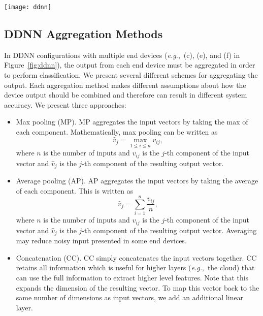 \documentclass[10pt, conference, compsocconf]{IEEEtran}
\newcommand{\eg}{\emph{e.g.}}
\begin{document}
\begin{figure*}
    \centering
    \texttt{[image: ddnn]}
    \caption{Overview of the DDNN architecture. The vertical lines represent the DNN pipeline, which connects the horizontal bars (NN layers). (a) is the standard DNN (processed entirely in the cloud), (b) introduces end devices and a local exit point that may classify samples before the cloud, (c) extends (b) by adding multiple end devices which are aggregated together for classification, (d) and (e) extend (b) and (c) by adding edge layers between the cloud and end devices, and (f) shows how the edge can also be distributed like the end devices.}
    \label{fig:ddnn}
\end{figure*}

\subsection{DDNN Aggregation Methods}
\label{sec:agg}
In DDNN configurations with multiple end devices (\eg,~(c), (e), and (f) in Figure~\ref{fig:ddnn}), the output from each end device must be aggregated in order to perform classification. We present several different schemes for aggregating the output. Each aggregation method makes different assumptions about how the device output should be combined and therefore can result in different system accuracy. We present three approaches:
\begin{itemize}
    \item Max pooling (MP). MP aggregates the input vectors by taking the max of each component. Mathematically, max pooling can be written as 
    $$ {\hat v}_{j} = \max_{1 \leq i \leq n} v_{ij}, $$
    where $n$ is the number of inputs and $v_{ij}$ is the $j$-th component of the input vector and ${\hat v}_{j}$ is the $j$-th component of the resulting output vector.
    \item Average pooling (AP). AP aggregates the input vectors by taking the average of each component. This is written as
    $$ {\hat v}_{j} = \sum_{i=1}^n \frac{v_{ij}}{n}, $$
    where $n$ is the number of inputs and $v_{ij}$ is the $j$-th component of the input vector and ${\hat v}_{j}$ is the $j$-th component of the resulting output vector. Averaging may reduce noisy input presented in some end devices.  
    \item Concatenation (CC). CC simply concatenates the input vectors together. CC retains all information which is useful for higher layers (\eg,~the cloud) that can use the full information to extract higher level features. Note that this expands the dimension of the resulting vector. To map this vector back to the same number of dimensions as input vectors, we add an additional linear layer.
\end{itemize}
\end{document}

